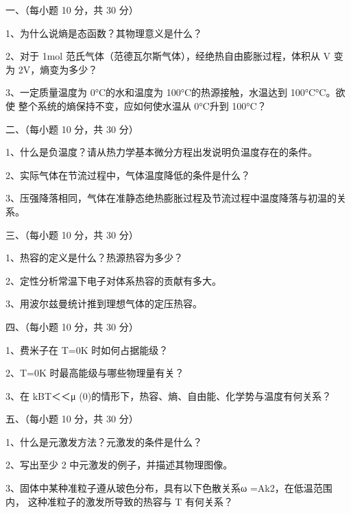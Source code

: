 
一、（每小题 10 分，共 30 分）

1、为什么说熵是态函数？其物理意义是什么？

2、对于 1mol 范氏气体（范德瓦尔斯气体），经绝热自由膨胀过程，体积从 V 变为
2V，熵变为多少？

3、一定质量温度为 0°C的水和温度为 100°C的热源接触，水温达到 100°C°C。欲使
整个系统的熵保持不变，应如何使水温从 0°C升到 100°C？

二、（每小题 10 分，共 30 分）

1、什么是负温度？请从热力学基本微分方程出发说明负温度存在的条件。

2、实际气体在节流过程中，气体温度降低的条件是什么？

3、压强降落相同，气体在准静态绝热膨胀过程及节流过程中温度降落与初温的关系。

三、（每小题 10 分，共 30 分）

1、热容的定义是什么？热源热容为多少？

2、定性分析常温下电子对体系热容的贡献有多大。

3、用波尔兹曼统计推到理想气体的定压热容。

四、（每小题 10 分，共 30 分）

1、费米子在 T=0K 时如何占据能级？

2、T=0K 时最高能级与哪些物理量有关？

3、在 kBT＜＜μ (0)的情形下，热容、熵、自由能、化学势与温度有何关系？

五、（每小题 10 分，共 30 分）

1、什么是元激发方法？元激发的条件是什么？

2、写出至少 2 中元激发的例子，并描述其物理图像。

3、固体中某种准粒子遵从玻色分布，具有以下色散关系ω =Ak2，在低温范围内，
这种准粒子的激发所导致的热容与 T 有何关系？